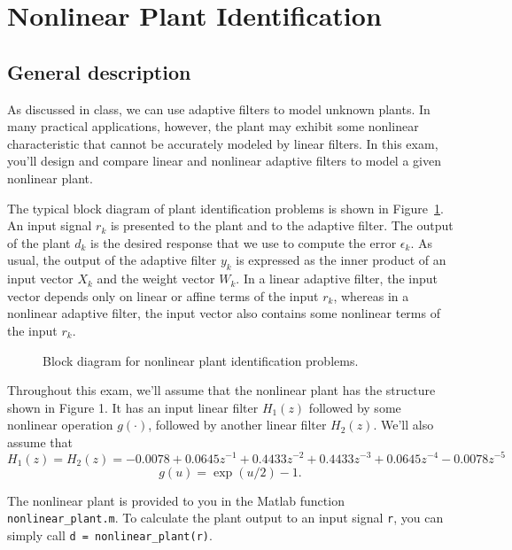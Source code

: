 \documentclass[10pt]{article}
\begin{document}
\doublespacing

\pagebreak


\section*{Nonlinear Plant Identification}

\subsection*{General description}

As discussed in class, we can use adaptive filters to model unknown plants. In many practical applications, however, the plant may exhibit some nonlinear characteristic that cannot be accurately modeled by linear filters. In this exam, you'll design and compare linear and nonlinear adaptive filters to model a given nonlinear plant.

The typical block diagram of plant identification problems is shown in Figure~\ref{fig:block-diagram}. An input signal $r_k$ is presented to the plant and to the adaptive filter. The output of the plant $d_k$ is the desired response that we use to compute the error $\epsilon_k$. As usual, the output of the adaptive filter $y_k$ is expressed as the inner product of an input vector $X_k$ and the weight vector $W_k$. In a linear adaptive filter, the input vector depends only on linear or affine terms of the input $r_k$, whereas in a nonlinear adaptive filter, the input vector also contains some nonlinear terms of the input $r_k$.

\begin{figure}[h!]
	\flushleft
	\resizebox{\linewidth}{!}{}
	\caption{Block diagram for nonlinear plant identification problems. } \label{fig:block-diagram}
\end{figure}

Throughout this exam, we'll assume that the nonlinear plant has the structure shown in Figure 1. It has an input linear filter $H_1(z)$ followed by some nonlinear operation $g(\cdot)$, followed by another linear filter $H_2(z)$. We'll also assume that
\begin{equation}
H_1(z) = H_2(z) = -0.0078 + 0.0645z^{-1} +  0.4433z^{-2} + 0.4433z^{-3}+ 0.0645z^{-4} -0.0078z^{-5}
\end{equation}
\begin{equation}
g(u) = \exp(u/2) - 1.
\end{equation}

The nonlinear plant is provided to you in the Matlab function \texttt{nonlinear\_plant.m}. To calculate the plant output to an input signal \texttt{r}, you can simply call \texttt{d = nonlinear\_plant(r)}.
\end{document}
